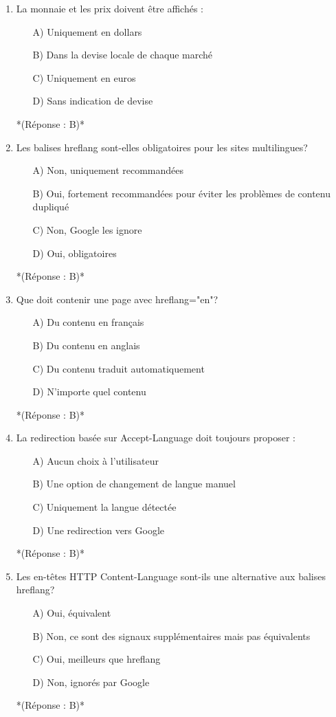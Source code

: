 \documentclass[12pt,a4paper,twoside]{report}
\begin{document}
\begin{enumerate}
\item La monnaie et les prix doivent être affichés :
\begin{itemize}
\item[A)] Uniquement en dollars
\item[B)] Dans la devise locale de chaque marché
\item[C)] Uniquement en euros
\item[D)] Sans indication de devise
\end{itemize}
*(Réponse : B)*

\item Les balises hreflang sont-elles obligatoires pour les sites multilingues?
\begin{itemize}
\item[A)] Non, uniquement recommandées
\item[B)] Oui, fortement recommandées pour éviter les problèmes de contenu dupliqué
\item[C)] Non, Google les ignore
\item[D)] Oui, obligatoires
\end{itemize}
*(Réponse : B)*

\item Que doit contenir une page avec hreflang="en"?
\begin{itemize}
\item[A)] Du contenu en français
\item[B)] Du contenu en anglais
\item[C)] Du contenu traduit automatiquement
\item[D)] N'importe quel contenu
\end{itemize}
*(Réponse : B)*

\item La redirection basée sur Accept-Language doit toujours proposer :
\begin{itemize}
\item[A)] Aucun choix à l'utilisateur
\item[B)] Une option de changement de langue manuel
\item[C)] Uniquement la langue détectée
\item[D)] Une redirection vers Google
\end{itemize}
*(Réponse : B)*

\item Les en-têtes HTTP Content-Language sont-ils une alternative aux balises hreflang?
\begin{itemize}
\item[A)] Oui, équivalent
\item[B)] Non, ce sont des signaux supplémentaires mais pas équivalents
\item[C)] Oui, meilleurs que hreflang
\item[D)] Non, ignorés par Google
\end{itemize}
*(Réponse : B)*


\end{enumerate}
\end{document}
